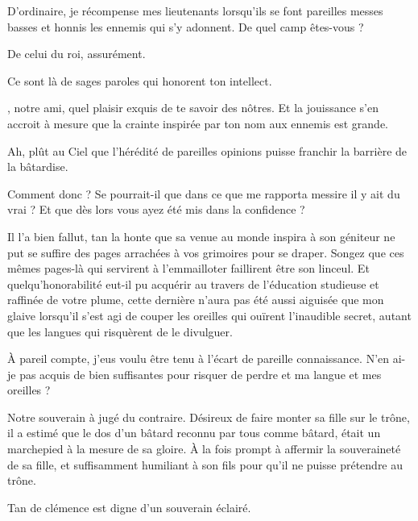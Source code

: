 \scene

\StageDirII{\elena, \alexas, \general{}}


\begin{drama}
  \generalspeaks D’ordinaire, je récompense mes lieutenants lorsqu’ils se font pareilles messes basses et honnis les ennemis qui s’y adonnent. De quel camp êtes-vous ? 

  \alexasspeaks De celui du roi, assurément.

  \generalspeaks Ce sont là de sages paroles qui honorent ton intellect.

  \elenaspeaks \general, notre ami, quel plaisir exquis de te savoir des nôtres. Et la jouissance s’en accroit à mesure que la crainte inspirée par ton nom aux ennemis est grande.

  \generalspeaks Ah, plût au Ciel que l’hérédité de pareilles opinions puisse franchir la barrière de la bâtardise.

  \alexasspeaks Comment donc \general ? Se pourrait-il que dans ce que me rapporta messire \elena il y ait du vrai ? Et que dès lors vous ayez été mis dans la confidence ? 

  \generalspeaks
  Il l’a bien fallut, tan la honte que sa venue au monde inspira à son géniteur ne put se suffire des pages arrachées à vos grimoires pour se draper. Songez que ces mêmes pages-là qui servirent à l’emmailloter faillirent être son linceul.
  Et quelqu’honorabilité eut-il pu acquérir au travers de l’éducation studieuse et raffinée de votre plume, cette dernière n’aura pas été aussi aiguisée que mon glaive lorsqu’il s’est agi de couper les oreilles qui ouïrent l’inaudible secret, autant que les langues qui risquèrent de le divulguer.

  \alexasspeaks À pareil compte, j’eus voulu être tenu à l’écart de pareille connaissance. N’en ai-je pas acquis de bien suffisantes pour risquer de perdre et ma langue et mes oreilles ?

  \generalspeaks Notre souverain à jugé du contraire. Désireux de faire monter sa fille sur le trône, il a estimé que le dos d’un bâtard reconnu par tous comme bâtard, était un marchepied à la mesure de sa gloire. À la fois prompt à affermir la souveraineté de sa fille, et suffisamment humiliant à son fils pour qu’il ne puisse prétendre au trône.

  \elenaspeaks Tan de clémence est digne d’un souverain éclairé.


\end{drama}
